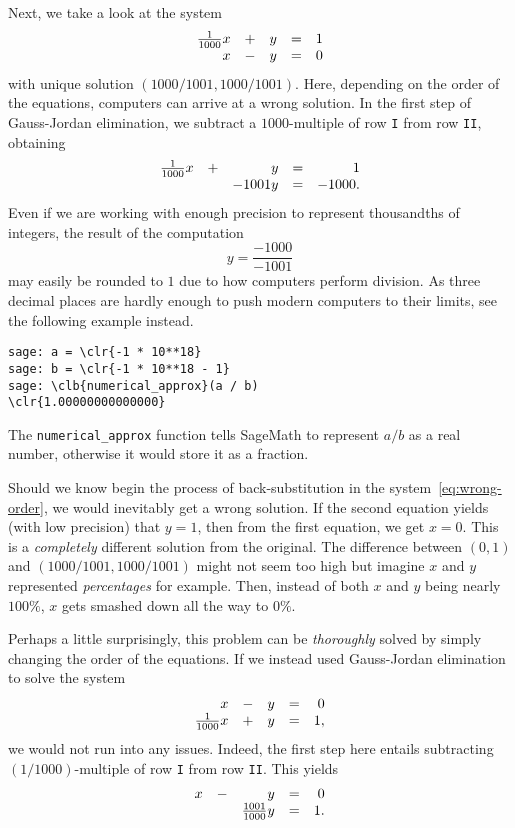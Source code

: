 Next, we take a look at the system
\[
 \begin{array}{r c r c r}
  \frac{1}{1000}x & + & y & = & 1\\
  x & - & y & = & 0
 \end{array}
\]
with unique solution $(1000 / 1001, 1000 / 1001)$. Here, depending on the order
of the equations, computers can arrive at a wrong solution. In the first step of
Gauss-Jordan elimination, we subtract a $1000$-multiple of row \texttt{I} from
row \texttt{II}, obtaining
\begin{equation}
 \label{eq:wrong-order}
 \begin{array}{r c r c r}
  \frac{1}{1000}x & + & y & = & 1\\
  & & -1001 y & = & -1000.
 \end{array}
\end{equation}
Even if we are working with enough precision to represent thousandths of
integers, the result of the computation
\[
 y = \frac{-1000}{-1001}
\]
may easily be rounded to $1$ due to how computers perform division. As three
decimal places are hardly enough to push modern computers to their limits, see
the following example instead.
\begin{Verbatim}
sage: a = \clr{-1 * 10**18}
sage: b = \clr{-1 * 10**18 - 1}
sage: \clb{numerical_approx}(a / b)
\clr{1.00000000000000}
\end{Verbatim}
The \texttt{numerical\_approx} function tells SageMath to represent $a / b$ as a
real number, otherwise it would store it as a fraction.

Should we know begin the process of back-substitution in the
system~\eqref{eq:wrong-order}, we would inevitably get a wrong solution. If the
second equation yields (with low precision) that $y = 1$, then from the first
equation, we get $x = 0$. This is a \emph{completely} different solution from
the original. The difference between $(0,1)$ and $(1000 / 1001, 1000 / 1001)$
might not seem too high but imagine $x$ and $y$ represented \emph{percentages}
for example. Then, instead of both $x$ and $y$ being nearly $100\%$, $x$ gets
smashed down all the way to $0 \%$.

Perhaps a little surprisingly, this problem can be \emph{thoroughly} solved by
simply changing the order of the equations. If we instead used Gauss-Jordan
elimination to solve the system
\[
 \begin{array}{r c r c r}
  x & - & y & = & 0\\
  \frac{1}{1000}x & + & y & = & 1,
 \end{array}
\]
we would not run into any issues. Indeed, the first step here entails
subtracting $(1 / 1000)$-multiple of row \texttt{I} from row \texttt{II}. This
yields
\[
 \begin{array}{r c r c r}
  x & - & y & = & 0\\
  & & \frac{1001}{1000}y & = & 1.
 \end{array}
\]
